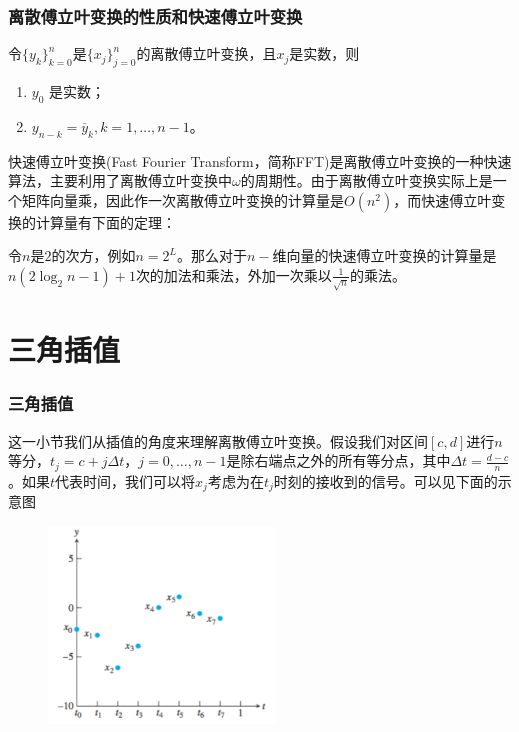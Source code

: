 \documentclass[10pt]{beamer}
\def\Dt{\Delta t}
\begin{document}
\begin{frame}
\frametitle{离散傅立叶变换的性质和快速傅立叶变换}
\begin{lemma}
\label{thm: DFT Property 1}
令$\{y_k\}_{k = 0}^{n}$是$\{x_j\}_{j = 0}^{n}$的离散傅立叶变换，且$x_j$是实数，则
\begin{enumerate}
\item $y_0$ 是实数；
\item $y_{n-k} = \overline{y}_k, k = 1, \ldots, n-1$。
\end{enumerate}
\end{lemma}

快速傅立叶变换(Fast Fourier Transform，简称FFT)是离散傅立叶变换的一种快速算法，主要利用了离散傅立叶变换中$\omega$的周期性。由于离散傅立叶变换实际上是一个矩阵向量乘，因此作一次离散傅立叶变换的计算量是$O(n^2)$，而快速傅立叶变换的计算量有下面的定理：

\begin{theorem}
令$n$是$2$的次方，例如$n = 2^L$。那么对于$n-$维向量的快速傅立叶变换的计算量是$n(2\log_2n-1) +1$次的加法和乘法，外加一次乘以$\frac{1}{\sqrt{n}}$的乘法。
\end{theorem}

\end{frame}



\section{三角插值}

\begin{frame}
\frametitle{三角插值}
这一小节我们从插值的角度来理解离散傅立叶变换。假设我们对区间$[c,d]$进行$n$等分，$t_j = c + j \Dt$，$j = 0, \ldots, n-1$是除右端点之外的所有等分点，其中$\Dt = \frac{d-c}{n}$。如果$t$代表时间，我们可以将$x_j$考虑为在$t_j$时刻的接收到的信号。可以见下面的示意图
\begin{figure}
\includegraphics[width=6cm]{figs/10-2-1_DFT_Interp-1} 
\end{figure}
\end{frame}
\end{document}
